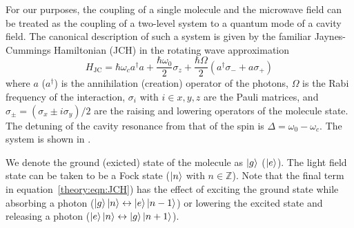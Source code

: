For our purposes, the coupling of a single molecule and the microwave field can
be treated as the coupling of a two-level system to a quantum mode of a cavity
field. The canonical description of such a system is given by the familiar
Jaynes-Cummings Hamiltonian (JCH) in the rotating wave
approximation~\cite{gerry_knight_2004}
%
\begin{equation}
  H_\text{JC} = \hbar\omega_c a^\dagger a + \frac{\hbar \omega_0}{2} \sigma_z +
  \frac{\hbar\Omega}{2}(a^\dagger \sigma_- + a\sigma_+)
  \label{theory:eqn:JCH}
\end{equation}
%
where $a$ ($a^\dagger$) is the annihilation (creation) operator of the photons,
$\Omega$ is the Rabi frequency of the interaction, $\sigma_i$ with $i\in{x, y,
z}$ are the Pauli matrices, and $\sigma_\pm =
(\sigma_x \pm i\sigma_y)/2$ are the raising and lowering operators of the
molecule state. The
detuning of the cavity resonance from that of the spin is $\Delta = \omega_0 -
\omega_c$. The system is shown in .

\begin{figure}
  \caption{}
  \label{theory:fig:JCHstates}
\end{figure}

We denote the ground (exicted) state of the molecule as $\ket{g}$ ($\ket{e}$).
The light field state can be taken to be a Fock state ($\ket{n}$ with $n \in
\mathbb{Z}$). Note that the final term in equation~\ref{theory:eqn:JCH}) has
the effect of exciting the ground state while absorbing a photon
($\ket{g}\ket{n} \leftrightarrow \ket{e}\ket{n-1}$) or lowering the excited state
and releasing a photon ($\ket{e}\ket{n} \leftrightarrow \ket{g}\ket{n+1}$).

